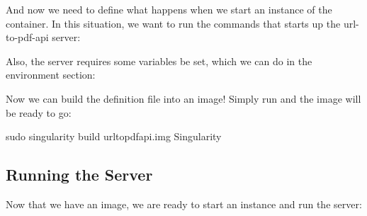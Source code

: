 \documentclass[letterpaper,10pt,english]{sphinxmanual}
\begin{document}
And now we need to define what happens when we start an instance of the
container. In this situation, we want to run the commands that starts up
the url-to-pdf-api server:

%
\begin{sphinxVerbatim}[commandchars=\\\{\}]

     


            
\end{sphinxVerbatim}

Also, the  server requires  some variables be set, which we can do in the
environment section:

%
\begin{sphinxVerbatim}[commandchars=\\\{\}]





        
\end{sphinxVerbatim}

Now we can build the definition file into an image! Simply run  and the
image will be ready to go:

%
\begin{sphinxVerbatim}[commandchars=\\\{\}]
\PYGZdl{} sudo singularity build url\PYGZhy{}to\PYGZhy{}pdf\PYGZhy{}api.img Singularity
\end{sphinxVerbatim}


\subsection{Running the Server}
\label{\detokenize{running_services:running-the-server}}
Now that we have an image, we are ready to start an instance and run the
server:
\end{document}
